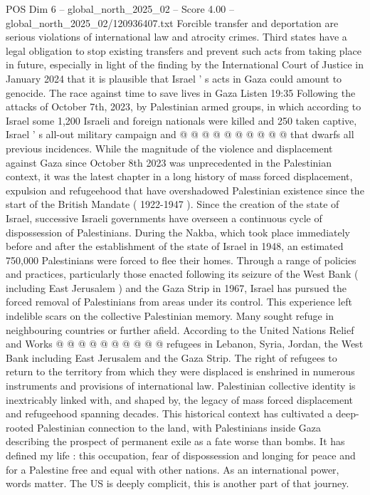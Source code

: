 \begin{textsample}{POS Dim 6 – global\_north\_2025\_02 – Score 4.00 – global\_north\_2025\_02/120936407.txt}
Forcible transfer and deportation are serious violations of international law and atrocity crimes.
Third states have a legal obligation to stop existing transfers and prevent such acts from taking place in future, especially in light of the finding by the International Court of Justice in January 2024 that it is plausible that Israel ' s acts in Gaza could amount to genocide.
The race against time to save lives in Gaza Listen 19:35 Following the attacks of October 7th, 2023, by Palestinian armed groups, in which according to Israel some 1,200 Israeli and foreign nationals were killed and 250 taken captive, Israel ' s all-out military campaign and @ @ @ @ @ @ @ @ @ @ that dwarfs all previous incidences.
While the magnitude of the violence and displacement against Gaza since October 8th 2023 was unprecedented in the Palestinian context, it was the latest chapter in a long history of mass forced displacement, expulsion and refugeehood that have overshadowed Palestinian existence since the start of the British Mandate ( 1922-1947 ).
Since the creation of the state of Israel, successive Israeli governments have overseen a continuous cycle of dispossession of Palestinians.
During the Nakba, which took place immediately before and after the establishment of the state of Israel in 1948, an estimated 750,000 Palestinians were forced to flee their homes.
Through a range of policies and practices, particularly those enacted following its seizure of the West Bank ( including East Jerusalem ) and the Gaza Strip in 1967, Israel has pursued the forced removal of Palestinians from areas under its control.
This experience left indelible scars on the collective Palestinian memory.
Many sought refuge in neighbouring countries or further afield.
According to the United Nations Relief and Works @ @ @ @ @ @ @ @ @ @ refugees in Lebanon, Syria, Jordan, the West Bank including East Jerusalem and the Gaza Strip.
The right of refugees to return to the territory from which they were displaced is enshrined in numerous instruments and provisions of international law.
Palestinian collective identity is inextricably linked with, and shaped by, the legacy of mass forced displacement and refugeehood spanning decades.
This historical context has cultivated a deep-rooted Palestinian connection to the land, with Palestinians inside Gaza describing the prospect of permanent exile as a fate worse than bombs.
It has defined my life : this occupation, fear of dispossession and longing for peace and for a Palestine free and equal with other nations.
As an international power, words matter.
The US is deeply complicit, this is another part of that journey.

\end{textsample}
